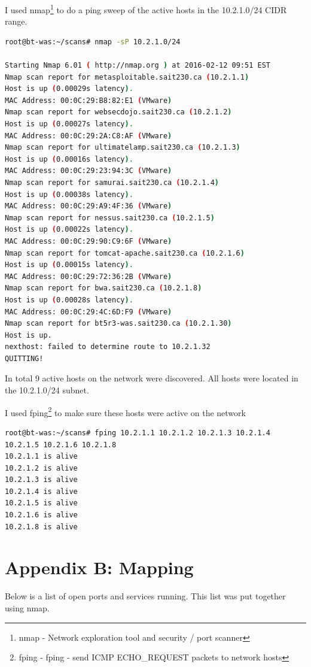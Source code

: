 \documentclass{article}
\begin{document}
I used nmap\footnote{\label{nmap}nmap - Network exploration tool and security / port scanner} 
to do a ping sweep of the active hosts in the 
10.2.1.0/24 CIDR range.

\begin{lstlisting}[language=Bash, firstline=1, lastline=1]
root@bt-was:~/scans# nmap -sP 10.2.1.0/24

Starting Nmap 6.01 ( http://nmap.org ) at 2016-02-12 09:51 EST
Nmap scan report for metasploitable.sait230.ca (10.2.1.1)
Host is up (0.00029s latency).
MAC Address: 00:0C:29:B8:82:E1 (VMware)
Nmap scan report for websecdojo.sait230.ca (10.2.1.2)
Host is up (0.00027s latency).
MAC Address: 00:0C:29:2A:C8:AF (VMware)
Nmap scan report for ultimatelamp.sait230.ca (10.2.1.3)
Host is up (0.00016s latency).
MAC Address: 00:0C:29:23:94:3C (VMware)
Nmap scan report for samurai.sait230.ca (10.2.1.4)
Host is up (0.00038s latency).
MAC Address: 00:0C:29:A9:4F:36 (VMware)
Nmap scan report for nessus.sait230.ca (10.2.1.5)
Host is up (0.00022s latency).
MAC Address: 00:0C:29:90:C9:6F (VMware)
Nmap scan report for tomcat-apache.sait230.ca (10.2.1.6)
Host is up (0.00015s latency).
MAC Address: 00:0C:29:72:36:2B (VMware)
Nmap scan report for bwa.sait230.ca (10.2.1.8)
Host is up (0.00028s latency).
MAC Address: 00:0C:29:4C:6D:F9 (VMware)
Nmap scan report for bt5r3-was.sait230.ca (10.2.1.30)
Host is up.
nexthost: failed to determine route to 10.2.1.32
QUITTING!
\end{lstlisting}

In total 9 active hosts on the network were discovered. All hosts were
located in the 10.2.1.0/24 subnet.

I used fping\footnote{\label{fping}fping - fping - send ICMP ECHO\_REQUEST packets to network hosts} 
to make sure these hosts were active on the network

\begin{lstlisting}
root@bt-was:~/scans# fping 10.2.1.1 10.2.1.2 10.2.1.3 10.2.1.4 10.2.1.5 10.2.1.6 10.2.1.8
10.2.1.1 is alive
10.2.1.2 is alive
10.2.1.3 is alive
10.2.1.4 is alive
10.2.1.5 is alive
10.2.1.6 is alive
10.2.1.8 is alive
\end{lstlisting}


\newpage
\section{Appendix B: Mapping}

Below is a list of open ports and services running. This list was put together using nmap.
\end{document}
